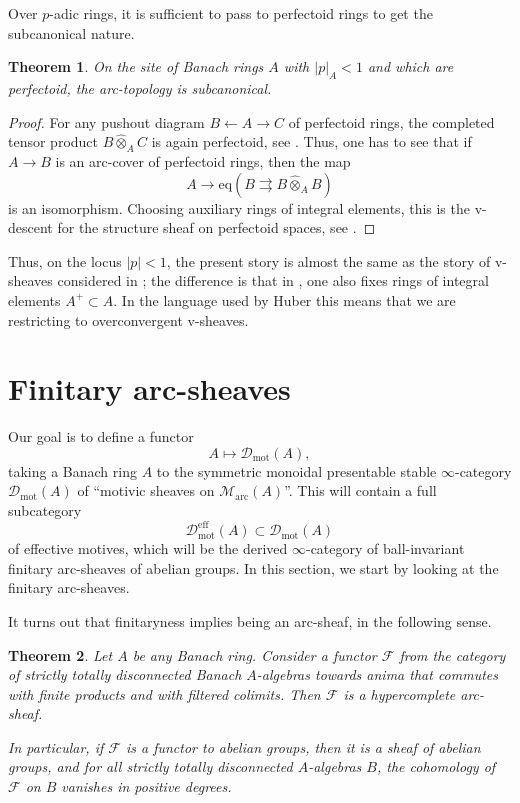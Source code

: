 \documentclass[11pt]{amsart}
\numberwithin{equation}{section}
\newtheorem{theorem}{Theorem}
\numberwithin{theorem}{section}
\theoremstyle{definition}
\begin{document}
Over $p$-adic rings, it is sufficient to pass to perfectoid rings to get the subcanonical nature.

\begin{theorem} On the site of Banach rings $A$ with $|p|_A<1$ and which are perfectoid, the arc-topology is subcanonical.
\end{theorem}

\begin{proof} For any pushout diagram $B\leftarrow A\to C$ of perfectoid rings, the completed tensor product $B\hat{\otimes}_A C$ is again perfectoid, see \cite[Proposition 6.18]{ScholzePerfectoid}. Thus, one has to see that if $A\to B$ is an arc-cover of perfectoid rings, then the map
\[
A\to \mathrm{eq}(B\rightrightarrows B\hat{\otimes}_A B)
\]
is an isomorphism. Choosing auxiliary rings of integral elements, this is the v-descent for the structure sheaf on perfectoid spaces, see \cite[Proposition 8.8]{ECoD}.
\end{proof}

Thus, on the locus $|p|<1$, the present story is almost the same as the story of v-sheaves considered in \cite{ECoD}; the difference is that in \cite{ECoD}, one also fixes rings of integral elements $A^+\subset A$. In the language used by Huber \cite{Huber} this means that we are restricting to overconvergent v-sheaves.

\section{Finitary arc-sheaves}

Our goal is to define a functor
\[
A\mapsto \mathcal D_{\mathrm{mot}}(A),
\]
taking a Banach ring $A$ to the symmetric monoidal presentable stable $\infty$-category $\mathcal D_{\mathrm{mot}}(A)$ of ``motivic sheaves on $\mathcal M_{\mathrm{arc}}(A)$''. This will contain a full subcategory
\[
\mathcal D_{\mathrm{mot}}^{\mathrm{eff}}(A)\subset \mathcal D_{\mathrm{mot}}(A)
\]
of effective motives, which will be the derived $\infty$-category of ball-invariant finitary arc-sheaves of abelian groups. In this section, we start by looking at the finitary arc-sheaves.

It turns out that finitaryness implies being an arc-sheaf, in the following sense.

\begin{theorem}\label{theorem:finitaryarc} Let $A$ be any Banach ring. Consider a functor $\mathcal F$ from the category of strictly totally disconnected Banach $A$-algebras towards anima that commutes with finite products and with filtered colimits. Then $\mathcal F$ is a hypercomplete arc-sheaf.

In particular, if $\mathcal F$ is a functor to abelian groups, then it is a sheaf of abelian groups, and for all strictly totally disconnected $A$-algebras $B$, the cohomology of $\mathcal F$ on $B$ vanishes in positive degrees.
\end{theorem}
\end{document}
